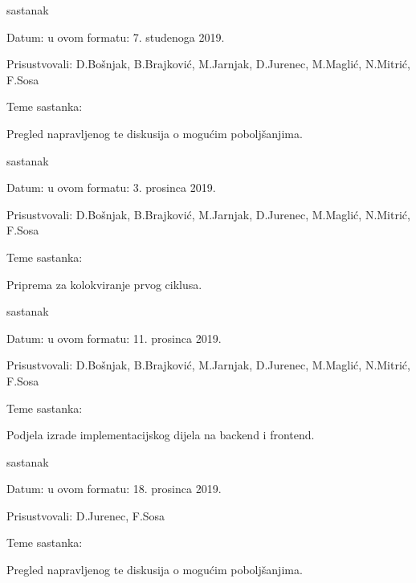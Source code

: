 \begin{packed_enum}
			\item  sastanak
			\item[] \begin{packed_item}
				\item Datum: u ovom formatu: 7. studenoga 2019.
				\item Prisustvovali: D.Bošnjak, B.Brajković, M.Jarnjak, D.Jurenec, M.Maglić, N.Mitrić, F.Sosa
				\item Teme sastanka:
				\begin{packed_item}
					\item  Pregled napravljenog te diskusija o mogućim poboljšanjima.
				\end{packed_item}
			\end{packed_item}
		
			\item  sastanak
			\item[] \begin{packed_item}
				\item Datum: u ovom formatu: 3. prosinca 2019.
				\item Prisustvovali: D.Bošnjak, B.Brajković, M.Jarnjak, D.Jurenec, M.Maglić, N.Mitrić, F.Sosa
				\item Teme sastanka:
				\begin{packed_item}
					\item  Priprema za kolokviranje prvog ciklusa.
				\end{packed_item}
			\end{packed_item}
		
			\item  sastanak
			\item[] \begin{packed_item}
				\item Datum: u ovom formatu: 11. prosinca 2019.
				\item Prisustvovali: D.Bošnjak, B.Brajković, M.Jarnjak, D.Jurenec, M.Maglić, N.Mitrić, F.Sosa
				\item Teme sastanka:
				\begin{packed_item}
					\item  Podjela izrade implementacijskog dijela na backend i frontend.
				\end{packed_item}
			\end{packed_item}
		
			\item  sastanak
			\item[] \begin{packed_item}
				\item Datum: u ovom formatu: 18. prosinca 2019.
				\item Prisustvovali: D.Jurenec, F.Sosa
				\item Teme sastanka:
				\begin{packed_item}
					\item  Pregled napravljenog te diskusija o mogućim poboljšanjima.
				\end{packed_item}
			\end{packed_item}
		

\end{packed_enum}
